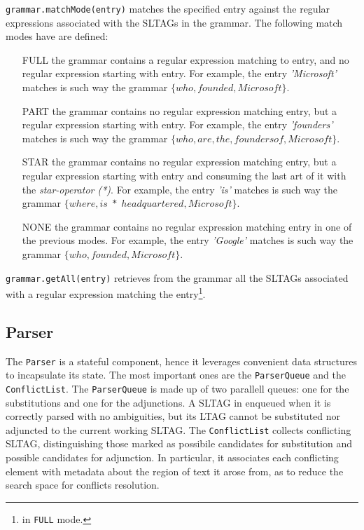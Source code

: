 \texttt{grammar.matchMode(entry)} matches the specified entry against the regular expressions associated with the SLTAGs in the grammar. 
%
The following match modes have are defined:
%
\begin{itemize}
	\item[FULL] the grammar contains a regular expression matching to entry, and no regular expression starting with entry. 
	For example, the entry \textit{'Microsoft'} matches is such way the grammar $\{who,founded,Microsoft\}$.
	
	\item[PART] the grammar contains no regular expression matching entry, but a regular expression starting with entry.
	For example, the entry \textit{'founders'} matches is such way the grammar $\{who,are,the,founders of,Microsoft\}$.
	
	\item[STAR] the grammar contains no regular expression matching entry, but a regular expression starting with entry and consuming the last art of it with the \textit{star-operator (*)}.
	For example, the entry \textit{'is'} matches is such way the grammar $\{where,is\;*\;headquartered,Microsoft\}$.

	\item[NONE] the grammar contains no regular expression matching entry in one of the previous modes.
	For example, the entry \textit{'Google'} matches is such way the grammar $\{who,founded,Microsoft\}$.
\end{itemize}

\texttt{grammar.getAll(entry)} retrieves from the grammar all the SLTAGs associated with a regular expression matching the entry\footnote{in \texttt{FULL} mode.}.


\subsection{Parser}
\label{sec:parsing-parser}

The \texttt{Parser} is a stateful component, hence it leverages convenient data structures to incapsulate its state.
%
The most important ones are the \texttt{ParserQueue} and the \texttt{ConflictList}.
%
The \texttt{ParserQueue} is made up of two parallell queues: one for the substitutions and one for the adjunctions. A SLTAG in enqueued when it is correctly parsed with no ambiguities, but its LTAG cannot be substituted nor adjuncted to the current working SLTAG.
%
The \texttt{ConflictList} collects conflicting SLTAG, distinguishing those marked as possibile candidates for substitution and possible candidates for adjunction. In particular, it associates each conflicting element with metadata about the region of text it arose from, as to reduce the search space for conflicts resolution.

